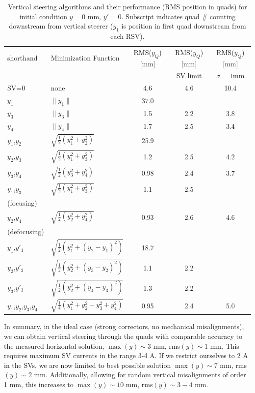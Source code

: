 \begin{table}[h]
\centering
\caption{Vertical steering algorithms and their performance (RMS position in quads) for initial condition $y=0$ mm, $y'=0$. Subscript indicates quad \# counting downstream from vertical steerer ($y_1$ is position in first quad downstream from each RSV).}
\label{tab:vert_algorithm}
\begin{tabular}{|l|l|c|c|c|}
\hline
shorthand & Minimization Function & RMS($y_Q$) [mm] & RMS($y_Q$) [mm] & RMS($y_Q$) [mm] \\
& & & SV limit & $\sigma = 1$mm \\
\hline
SV=0 & none  & 4.6 & 4.6 & 10.4 \\ \hline
$y_1$& $\| y_1 \|$ & 37.0 & & \\
$y_3$& $\| y_3 \|$ & 1.5& 2.2 & 3.8\\
$y_4$& $\| y_4 \|$ &  1.7& 2.5 & 3.4\\ \hline
$y_1$,$y_2$ & $\sqrt{\frac{1}{2}\left(y_1^2 +y_2^2\right)}$ &  25.9 & & \\
$y_2$,$y_3$ & $\sqrt{\frac{1}{2}\left(y_1^2 +y_3^2\right)}$ &  1.2& 2.5 & 4.2\\
$y_3$,$y_4$ & $\sqrt{\frac{1}{2}\left(y_3^2 +y_4^2\right)}$ &  0.98 & 2.4 & 3.7 \\
$y_1$,$y_3$ & $\sqrt{\frac{1}{2}\left(y_1^2 +y_3^2\right)}$ &  1.1 & 2.5& \\
(focusing) & & & & \\
$y_2$,$y_4$ & $\sqrt{\frac{1}{2}\left(y_2^2 +y_4^2\right)}$ &  0.93 & 2.6& 4.6\\
(defocusing) & & & & \\ \hline 
$y_1$,$y'_1$ & $\sqrt{\frac{1}{2}\left(y_1^2 +(y_2-y_1)^2\right)}$ & 18.7 & & \\
$y_2$,$y'_2$ & $\sqrt{\frac{1}{2}\left(y_2^2 +(y_3-y_2)^2\right)}$ & 1.1 & 2.2& \\
$y_3$,$y'_3$ & $\sqrt{\frac{1}{2}\left(y_2^2 +(y_4-y_3)^2\right)}$ & 1.3 & 2.2& \\
$y_1$,$y_2$,$y_3$,$y_4$ &  $\sqrt{\frac{1}{4}\left(y_1^2 +y_2^2+ y_3^2 +y_4^2\right)}$ & 0.95 & 2.4 & 5.0\\
\hline
\end{tabular}
\end{table}

In summary, in the ideal case (strong correctors, no mechanical misalignments), we can obtain vertical steering through the quads with comparable accuracy to the measured horizontal solution, $\max{(y)} \sim 3$ mm, rms$(y) \sim 1$ mm. This requires maximum SV currents in the range 3-4 A.  If we restrict ourselves to 2 A in the SVs, we are now limited to best possible solution $\max{(y)} \sim 7$ mm, rms$(y) \sim 2$ mm. Additionally, allowing for random vertical misalignments of order 1 mm, this increases to $\max{(y)} \sim 10$ mm, rms$(y) \sim 3-4$ mm.

